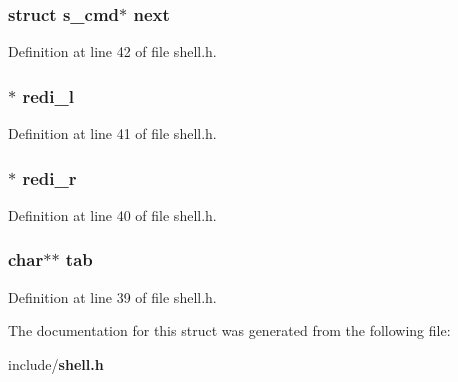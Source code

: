 \subsubsection[{next}]{\setlength{\rightskip}{0pt plus 5cm}struct {\bf s\-\_\-cmd}$\ast$ next}\label{structs__cmd_aadb06044d2e679ed4395a2680dc6962a}


Definition at line 42 of file shell.\-h.

\subsubsection[{redi\-\_\-l}]{$\ast$ redi\-\_\-l}\label{structs__cmd_a3eb86f4753299ed84389481f46694140}


Definition at line 41 of file shell.\-h.

\subsubsection[{redi\-\_\-r}]{$\ast$ redi\-\_\-r}\label{structs__cmd_a8629d9a24e605fcc6a82b55b1a870a07}


Definition at line 40 of file shell.\-h.

\subsubsection[{tab}]{\setlength{\rightskip}{0pt plus 5cm}char$\ast$$\ast$ tab}\label{structs__cmd_a095ef5f32e2dd3c36f801fc514372ee3}


Definition at line 39 of file shell.\-h.



The documentation for this struct was generated from the following file\-:\begin{DoxyCompactItemize}
\item 
include/{\bf shell.\-h}\end{DoxyCompactItemize}
